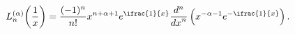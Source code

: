 \[\mathop{L^{(\alpha)}_{n}\/}\nolimits\!\left(\frac{1}{x}\right)=\frac{(-1)^{n}}%
{n!}x^{n+\alpha+1}e^{\ifrac{1}{x}}\frac{{d}^{n}}{{dx}^{n}}\left(x^{-\alpha-1}e%
^{-\ifrac{1}{x}}\right).\]